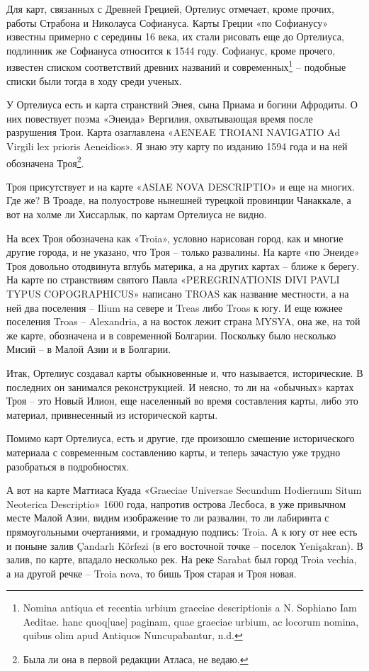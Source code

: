 Для карт, связанных с Древней Грецией, Ортелиус отмечает, кроме прочих, работы Страбона и Николауса Софиануса. Карты Греции «по Софианусу» известны примерно с середины 16 века, их стали рисовать еще до Ортелиуса, подлинник же Софиануса относится к 1544 году. Софианус, кроме прочего, известен списком соответствий древних названий и современных\footnote{Nomina antiqua et recentia urbium graeciae descriptionis a N. Sophiano Iam Aeditae. hanc quoq[uae] paginam, quae graeciae urbium, ac locorum nomina, quibus olim apud Antiquos Nuncupabantur, n.d.} – подобные списки были тогда в ходу среди ученых.

У Ортелиуса есть и карта странствий Энея, сына Приама и богини Афродиты. О них повествует поэма «Энеида» Вергилия, охватывающая время после разрушения Трои. Карта озаглавлена «AENEAE TROIANI NAVIGATIO Ad Virgili lex prioris Aeneidios». Я знаю эту карту по изданию 1594 года и на ней обозначена Троя\footnote{Была ли она в первой редакции Атласа, не ведаю.}.

Троя присутствует и на карте «ASIAE NOVA DESCRIP\-TIO» и еще на многих. Где же? В Троаде, на полуострове нынешней турецкой провинции Чанаккале, а вот на холме ли Хиссарлык, по картам Ортелиуса не видно. 

На всех Троя обозначена как «Troia», условно нарисован город, как и многие другие города, и не указано, что Троя – только развалины. На карте «по Энеиде» Троя довольно отодвинута вглубь материка, а на других картах – ближе к берегу. На карте по странствиям святого Павла «PEREGRINATIONIS DIVI PAVLI TYPUS COPOGRAPHICUS» написано TROAS как название местности, а на ней два поселения – Ilium на севере и Treas либо Troas к югу. И еще южнее поселения Troas – Alexandria, а на восток лежит страна MYSYA, она же, на той же карте, обозначена и в современной Болгарии. Поскольку было несколько Мисий – в Малой Азии и в Болгарии.

Итак, Ортелиус создавал карты обыкновенные и, что называется, исторические. В последних он занимался реконструкцией. И неясно, то ли на «обычных» картах Троя – это Новый Илион, еще населенный во время составления карты, либо это материал, привнесенный из исторической карты.

Помимо карт Ортелиуса, есть и другие, где произошло смешение исторического материала с современным составлению карты, и теперь зачастую уже трудно разобраться в подробностях. 

А вот на карте Маттиаса Куада «Graeciae Universae Secundum Hodiernum Situm Neoterica Descriptio» 1600 года, напротив острова Лесбоса, в уже привычном месте Малой Азии, видим изображение то ли развалин, то ли лабиринта с прямоугольными очертаниями, и громадную подпись: Troia. А к югу от нее есть и поныне залив Çandarlı Körfezi (в его восточной точке – поселок Yenişakran). В залив, по карте, впадало несколько рек. На реке Sarabat был город Troia vechia, а на другой речке – Troia nova, то бишь Троя старая и Троя новая.

